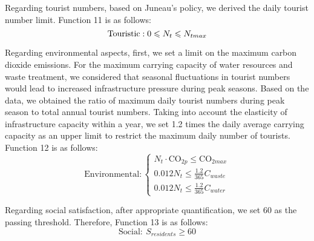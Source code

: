 \documentclass[12pt]{article}  %
\begin{document}
Regarding tourist numbers, based on Juneau's policy\cite{7}, we derived the daily tourist number limit. Function 11 is as follows:
\begin{equation}
	\text{Touristic}:
		0\leqslant N_{t}\leqslant N_{tmax}\\
\end{equation}

Regarding environmental aspects, first, we set a limit on the maximum carbon dioxide emissions. For the maximum carrying capacity of water resources and waste treatment, we considered that seasonal fluctuations in tourist numbers would lead to increased infrastructure pressure during peak seasons. Based on the data, we obtained the ratio of maximum daily tourist numbers during peak season to total annual tourist numbers. Taking into account the elasticity of infrastructure capacity within a year, we set 1.2 times the daily average carrying capacity as an upper limit to restrict the maximum daily number of tourists. Function 12 is as follows:
\begin{equation}
	\text{Environmental}:
	\begin{cases}
		N_{t}\cdot \text{CO}_{2p}\leqslant \text{CO}_{2max} \\
		0.012N_t\leqslant \frac{1.2}{365}C_{waste} \\
		0.012N_t\leqslant \frac{1.2}{365}C_{water}
	\end{cases}
\end{equation}

Regarding social satisfaction, after appropriate quantification, we set 60 as the passing threshold. Therefore, Function 13 is as follows:
\begin{equation}
	\text{Social}:\ S_{residents} \geqslant 60
\end{equation}	
\end{document}
